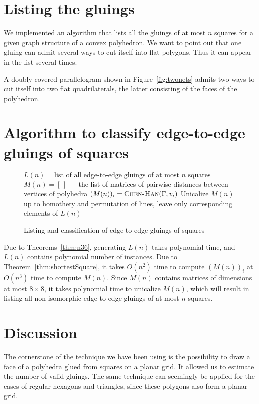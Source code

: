 \documentclass[a4paper,USenglish,cleveref, autoref, thm-restate]{socg-lipics-v2019}
\begin{document}
\section{Listing the gluings}

We implemented an algorithm that lists all the gluings of at most $n$ squares for a given graph structure of a convex polyhedron. We want to point out that one gluing can admit several ways to cut itself into flat polygons. Thus it can appear in the list several times.



\begin{example}
	A doubly covered parallelogram shown in Figure~\ref{fig:twonets} admits two ways to cut itself into two flat quadrilaterals, the latter consisting of the faces of the polyhedron.
\end{example}

\section{Algorithm to classify edge-to-edge gluings of squares}

\begin{figure}[h]
\begin{algorithmic}[1]
	\State $L(n) = \text{list of all edge-to-edge gluings of at most $n$ squares}$
	\State $M(n) = [\,]$ — the list of matrices of pairwise distances between vertices of polyhedra
		\State $(M(n))_i = \text{\scshape Chen-Han} (\Gamma,v_i)$
	\EndFor \EndFor
	\State Unicalize $M(n)$ up to homothety and permutation of lines, leave only corresponding elements of $L(n)$
\end{algorithmic}
	\caption{Listing and classification of edge-to-edge gluings of squares}
	\label{fig:alglistall}
\end{figure}

Due to Theorems~\ref{thm:n36}, generating $L(n)$ takes polynomial time, and $L(n)$ contains polynomial number of instances. Due to Theorem~\ref{thm:shortestSquare}, it takes $O(n^2)$ time to compute $(M(n))_i$ at $O(n^3)$ time to compute $M(n)$. Since $M(n)$ contains matrices of dimensions at most $8 \times 8$, it takes polynomial time to unicalize $M(n)$, which will result in listing all non-isomorphic edge-to-edge gluings of at most $n$ squares.

\section{Discussion}

The cornerstone of the technique we have been using is the possibility to draw a face of a polyhedra glued from squares on a planar grid. It allowed us to estimate the number of valid gluings. The same technique can seemingly be applied for the cases of regular hexagons and triangles, since these polygons also form a planar grid.


\end{document}
